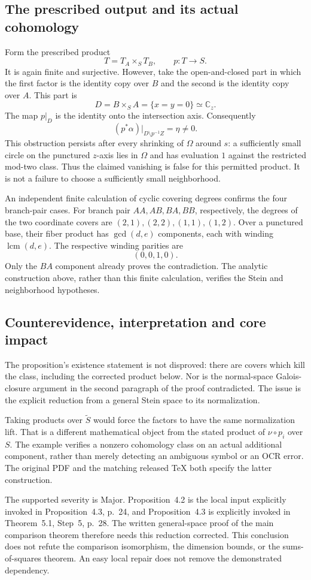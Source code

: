 \documentclass[10pt]{article}
\begin{document}
\subsection*{The prescribed output and its actual cohomology}
Form the prescribed product \[T=T_A\times_S T_B,\qquad p:T\to S .\] It is again finite and surjective. However, take the open-and-closed part in which the first factor is the identity copy over \(B\) and the second is the identity copy over \(A\). This part is \[D=B\times_S A=\{x=y=0\}\simeq\mathbb C_z.\] The map \(p|_D\) is the identity onto the intersection axis. Consequently \[(p^*\alpha)|_{D\setminus p^{-1}Z}=\eta\ne0.\] This obstruction persists after every shrinking of \(\Omega\) around \(s\): a sufficiently small circle on the punctured \(z\)-axis lies in \(\Omega\) and has evaluation \(1\) against the restricted mod-two class. Thus the claimed vanishing is false for this permitted product. It is not a failure to choose a sufficiently small neighborhood.\par
An independent finite calculation of cyclic covering degrees confirms the four branch-pair cases. For branch pair \(AA,AB,BA,BB\), respectively, the degrees of the two coordinate covers are \((2,1),(2,2),(1,1),(1,2)\). Over a punctured base, their fiber product has \(\gcd(d,e)\) components, each with winding \(\operatorname{lcm}(d,e)\). The respective winding parities are \[(0,0,1,0).\] Only the \(BA\) component already proves the contradiction. The analytic construction above, rather than this finite calculation, verifies the Stein and neighborhood hypotheses.\par
\subsection*{Counterevidence, interpretation and core impact}
The proposition’s existence statement is not disproved: there are covers which kill the class, including the corrected product below. Nor is the normal-space Galois-closure argument in the second paragraph of the proof contradicted. The issue is the explicit reduction from a general Stein space to its normalization.\par
Taking products over \(\widetilde S\) would force the factors to have the same normalization lift. That is a different mathematical object from the stated product of \(\nu\circ p_i\) over \(S\). The example verifies a nonzero cohomology class on an actual additional component, rather than merely detecting an ambiguous symbol or an OCR error. The original PDF and the matching released TeX both specify the latter construction.\par
The supported severity is Major. Proposition 4.2 is the local input explicitly invoked in Proposition 4.3, p. 24, and Proposition 4.3 is explicitly invoked in Theorem 5.1, Step 5, p. 28. The written general-space proof of the main comparison theorem therefore needs this reduction corrected. This conclusion does not refute the comparison isomorphism, the dimension bounds, or the sums-of-squares theorem. An easy local repair does not remove the demonstrated dependency.\par
\end{document}
